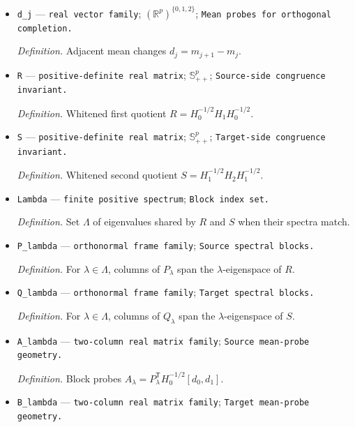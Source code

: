 \documentclass{article}
\begin{document}
\begin{itemize}
  \par\smallskip\noindent\emph{Definition.} Adjacent covariance decreases \(H_j=C_j-C_{j+1}\).
  \item \texttt{d\_\allowbreak{}j} --- \texttt{real vector family}; \((\mathbb R^p)^{\{0,1,2\}}\); \texttt{Mean probes for orthogonal completion.}
  \par\smallskip\noindent\emph{Definition.} Adjacent mean changes \(d_j=m_{j+1}-m_j\).
  \item \texttt{R} --- \texttt{positive-\allowbreak{}definite real matrix}; \(\mathbb S_{++}^{p}\); \texttt{Source-\allowbreak{}side congruence invariant.}
  \par\smallskip\noindent\emph{Definition.} Whitened first quotient \(R=H_0^{-1/2}H_1H_0^{-1/2}\).
  \item \texttt{S} --- \texttt{positive-\allowbreak{}definite real matrix}; \(\mathbb S_{++}^{p}\); \texttt{Target-\allowbreak{}side congruence invariant.}
  \par\smallskip\noindent\emph{Definition.} Whitened second quotient \(S=H_1^{-1/2}H_2H_1^{-1/2}\).
  \item \texttt{Lambda} --- \texttt{finite positive spectrum}; \texttt{Block index set.}
  \par\smallskip\noindent\emph{Definition.} Set \(\Lambda\) of eigenvalues shared by \(R\) and \(S\) when their spectra match.
  \item \texttt{P\_\allowbreak{}lambda} --- \texttt{orthonormal frame family}; \texttt{Source spectral blocks.}
  \par\smallskip\noindent\emph{Definition.} For \(\lambda\in\Lambda\), columns of \(P_\lambda\) span the \(\lambda\)-eigenspace of \(R\).
  \item \texttt{Q\_\allowbreak{}lambda} --- \texttt{orthonormal frame family}; \texttt{Target spectral blocks.}
  \par\smallskip\noindent\emph{Definition.} For \(\lambda\in\Lambda\), columns of \(Q_\lambda\) span the \(\lambda\)-eigenspace of \(S\).
  \item \texttt{A\_\allowbreak{}lambda} --- \texttt{two-\allowbreak{}column real matrix family}; \texttt{Source mean-\allowbreak{}probe geometry.}
  \par\smallskip\noindent\emph{Definition.} Block probes \(A_\lambda=P_\lambda^{\mathsf T}H_0^{-1/2}[d_0,d_1]\).
  \item \texttt{B\_\allowbreak{}lambda} --- \texttt{two-\allowbreak{}column real matrix family}; \texttt{Target mean-\allowbreak{}probe geometry.}

\end{itemize}
\end{document}
